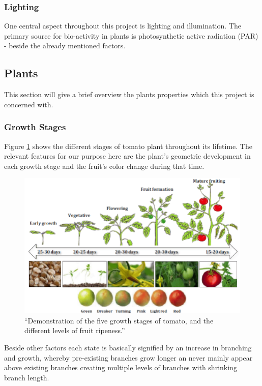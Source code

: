 \subsubsection*{Lighting}

One central aspect throughout this project is lighting and illumination.
The primary source for bio-activity in plants is photosynthetic active radiation (PAR) -
beside the already mentioned factors. 

\subsection{Plants}\label{subsec:plants}

This section will give a brief overview the plants properties which this project is concerned with.

\subsubsection*{Growth Stages}

Figure \ref{growth-stages} shows the different stages of tomato plant throughout its lifetime.
The relevant features for our purpose here are the plant's geometric development in each growth stage
and the fruit's color change during that time.

\begin{figure}[H]
    \centering
    \includegraphics[width=1.0\textwidth]{user-view/growth_stages.png}
    \caption{\enquote{Demonstration of the five growth stages of tomato, and the different levels of fruit ripeness.} \cite{Shamshiri2018}}
    \label{growth-stages}
\end{figure}

Beside other factors each state is basically signified by an increase in branching  and growth, whereby
pre-existing branches grow longer an never mainly appear above existing branches creating multiple levels
of branches with shrinking branch length. 
\newpage
